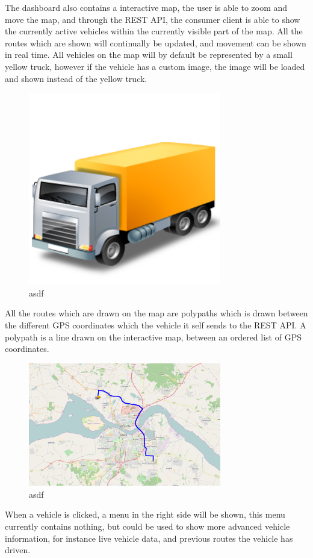 \bigskip
The dashboard also contains a interactive map, the user is able to zoom and move the map, and through the REST API, the consumer client is able to show the currently active vehicles within the currently visible part of the map.
All the routes which are shown will continually be updated, and movement can be shown in real time.
All vehicles on the map will by default be represented by a small yellow truck, however if the vehicle has a custom image, the image will be loaded and shown instead of the yellow truck.

\begin{figure}[h]
    \centering
    \includegraphics[width=0.75\textwidth]{img/Truck_Yellow.png}
    \caption{asdf}
    \label{fig:ConsumerClientYellowTruck}
\end{figure}

All the routes which are drawn on the map are polypaths which is drawn between the different GPS coordinates which the vehicle it self sends to the REST API.
A polypath is a line drawn on the interactive map, between an ordered list of GPS coordinates.


\bigskip
\begin{figure}[h]
    \centering
    \includegraphics[width=0.75\textwidth]{img/ConsumerClientMap.png}
    \caption{asdf}
    \label{fig:ConsumerClientMap}
\end{figure}
When a vehicle is clicked, a menu in the right side will be shown, this menu currently contains nothing, but could be used to show more advanced vehicle information, for instance live vehicle data, and previous routes the vehicle has driven.

